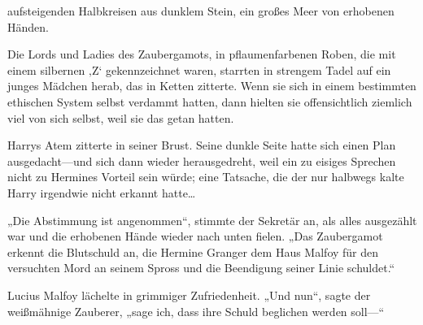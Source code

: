 

 aufsteigenden Halbkreisen aus dunklem Stein, ein großes Meer von erhobenen Händen.

\hplettrineextrapara
Die Lords und Ladies des Zaubergamots, in pflaumenfarbenen Roben, die mit einem silbernen ‚Z‘ gekennzeichnet waren, starrten in strengem Tadel auf ein junges Mädchen herab, das in Ketten zitterte. Wenn sie sich in einem bestimmten ethischen System selbst verdammt hatten, dann hielten sie offensichtlich ziemlich viel von sich selbst, weil sie das getan hatten.

Harrys Atem zitterte in seiner Brust. Seine dunkle Seite hatte sich einen Plan ausgedacht—und sich dann wieder herausgedreht, weil ein zu eisiges Sprechen nicht zu Hermines Vorteil sein würde; eine Tatsache, die der nur halbwegs kalte Harry irgendwie nicht erkannt hatte…

„Die Abstimmung ist angenommen“, stimmte der Sekretär an, als alles ausgezählt war und die erhobenen Hände wieder nach unten fielen.
„Das Zaubergamot erkennt die Blutschuld an, die Hermine Granger dem Haus Malfoy für den versuchten Mord an seinem Spross und die Beendigung seiner Linie schuldet.“

Lucius Malfoy lächelte in grimmiger Zufriedenheit.
„Und nun“, sagte der weißmähnige Zauberer, „sage ich, dass ihre Schuld beglichen werden soll—“

